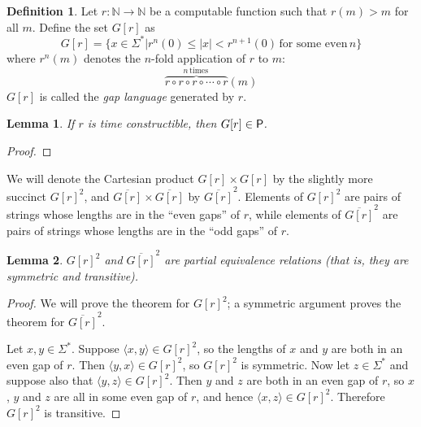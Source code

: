 \documentclass{article}
\newtheorem{lemma}[lemma]{Lemma}
\theoremstyle{definition} \newtheorem{definition}[definition]{Definition}
\newcommand{\plain}[1]{\,\text{#1}\,} %
\newcommand{\defn}[1]{\emph{#1}} %
\newcommand{\pair}[2]{\langle#1,#2\rangle} %
\begin{document}
\begin{definition}
  Let $r\colon\mathbb{N}\to\mathbb{N}$ be a computable function such that
  $r(m)>m$ for all $m$. Define the set $G[r]$ as
  \begin{displaymath}
    G[r]=\{x\in\Sigma^*|r^n(0)\leq|x|<r^{n+1}(0) \plain{for some even} n\}
  \end{displaymath}
  where $r^n(m)$ denotes the $n$-fold application of $r$ to $m$:
  \begin{displaymath}
    \overbrace{r\circ r\circ r\circ\cdots\circ r}^{n \plain{times}}(m)
  \end{displaymath}
  $G[r]$ is called the \defn{gap language} generated by $r$.
\end{definition}

\begin{lemma}\label{lem:gap_p}
  If $r$ is time constructible, then $G[r]\in\P$.
\end{lemma}
\begin{proof}
\end{proof}

We will denote the Cartesian product $G[r]\times G[r]$ by the slightly more
succinct ${G[r]}^2$, and $\overline{G[r]}\times\overline{G[r]}$ by
$\overline{G[r]}^2$. Elements of ${G[r]}^2$ are pairs of strings whose lengths
are in the ``even gaps'' of $r$, while elements of $\overline{G[r]}^2$ are
pairs of strings whose lengths are in the ``odd gaps'' of $r$.

\begin{lemma}
  ${G[r]}^2$ and $\overline{G[r]}^2$ are partial equivalence relations (that
  is, they are symmetric and transitive).
\end{lemma}
\begin{proof}
  We will prove the theorem for ${G[r]}^2$; a symmetric argument proves the
  theorem for $\overline{G[r]}^2$.

  Let $x,y\in\Sigma^*$. Suppose $\pair{x}{y}\in {G[r]}^2$, so the lengths of
  $x$ and $y$ are both in an even gap of $r$. Then $\pair{y}{x}\in{G[r]}^2$, so
  ${G[r]}^2$ is symmetric. Now let $z\in\Sigma^*$ and suppose also that
  $\pair{y}{z}\in {G[r]}^2$. Then $y$ and $z$ are both in an even gap of $r$,
  so $x$, $y$ and $z$ are all in some even gap of $r$, and hence
  $\pair{x}{z}\in {G[r]}^2$. Therefore ${G[r]}^2$ is transitive.
\end{proof}
\end{document}
